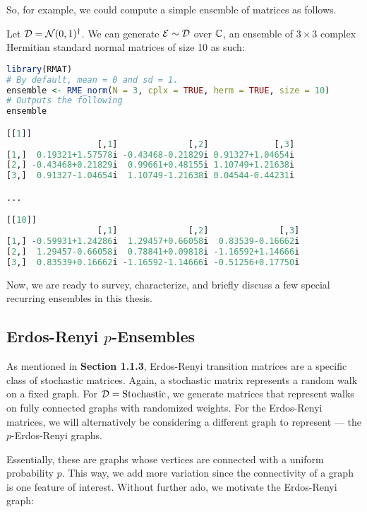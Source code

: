 \medskip
 So, for example, we could compute a simple ensemble of matrices as follows.
\begin{code}
Let $\mathcal{D} = \mathcal{N}(0,1)^{\dagger}$. We can generate $\mathcal{E} \sim \mathcal{D}$ over $\mathbb{C}$, an ensemble of $3 \times 3$ complex Hermitian standard normal matrices of size 10 as such:
\end{code}

\begin{lstlisting}[language=R]
library(RMAT)
# By default, mean = 0 and sd = 1.
ensemble <- RME_norm(N = 3, cplx = TRUE, herm = TRUE, size = 10)
# Outputs the following
ensemble

[[1]]
                  [,1]              [,2]             [,3]
[1,]  0.19321+1.57578i -0.43468-0.21829i 0.91327+1.04654i
[2,] -0.43468+0.21829i  0.99661+0.48155i 1.10749+1.21638i
[3,]  0.91327-1.04654i  1.10749-1.21638i 0.04544-0.44231i

...

[[10]]
                  [,1]              [,2]              [,3]
[1,] -0.59931+1.24286i  1.29457+0.66058i  0.83539-0.16662i
[2,]  1.29457-0.66058i  0.78841+0.09818i -1.16592+1.14666i
[3,]  0.83539+0.16662i -1.16592-1.14666i -0.51256+0.17750i
\end{lstlisting}

Now, we are ready to survey, characterize, and briefly discuss a few special recurring ensembles in this thesis.

\newpage


\subsection{Erdos-Renyi $p$-Ensembles}

As mentioned in \textbf{Section 1.1.3}, Erdos-Renyi transition matrices are a specific class of stochastic matrices.
Again, a stochastic matrix represents a random walk on a fixed graph. For $\mathcal{D} = \text{Stochastic}$, we generate matrices that represent walks on fully connected graphs with randomized weights.
For the Erdos-Renyi matrices, we will alternatively be considering a different graph to represent --- the $p$-Erdos-Renyi graphs.

Essentially, these are graphs whose vertices are connected with a uniform probability $p$.
This way, we add more variation since the connectivity of a graph is one feature of interest.
Without further ado, we motivate the Erdos-Renyi graph:

